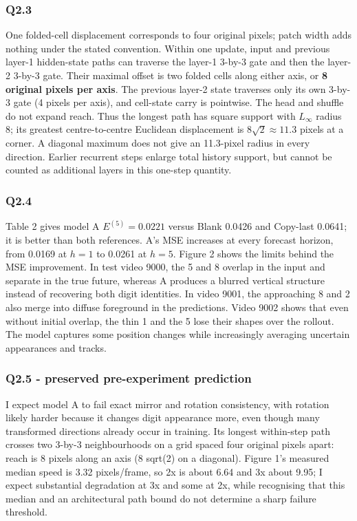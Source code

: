 \documentclass[
  10pt,
  a4paper,
]{article}
\begin{document}
\subsubsection{Q2.3}\label{q2.3}

One folded-cell displacement corresponds to four original pixels; patch
width adds nothing under the stated convention. Within one update, input
and previous layer-1 hidden-state paths can traverse the layer-1 3-by-3
gate and then the layer-2 3-by-3 gate. Their maximal offset is two
folded cells along either axis, or \textbf{8 original pixels per axis}.
The previous layer-2 state traverses only its own 3-by-3 gate (4 pixels
per axis), and cell-state carry is pointwise. The head and shuffle do
not expand reach. Thus the longest path has square support with
\(L_\infty\) radius 8; its greatest centre-to-centre Euclidean
displacement is \(8\sqrt2\approx11.3\) pixels at a corner. A diagonal
maximum does not give an 11.3-pixel radius in every direction. Earlier
recurrent steps enlarge total history support, but cannot be counted as
additional layers in this one-step quantity.

\subsubsection{Q2.4}\label{q2.4}

Table 2 gives model A \(E^{(5)}=0.0221\) versus Blank 0.0426 and
Copy-last 0.0641; it is better than both references. A's MSE increases
at every forecast horizon, from 0.0169 at \(h=1\) to 0.0261 at \(h=5\).
Figure 2 shows the limits behind the MSE improvement. In test video
9000, the 5 and 8 overlap in the input and separate in the true future,
whereas A produces a blurred vertical structure instead of recovering
both digit identities. In video 9001, the approaching 8 and 2 also merge
into diffuse foreground in the predictions. Video 9002 shows that even
without initial overlap, the thin 1 and the 5 lose their shapes over the
rollout. The model captures some position changes while increasingly
averaging uncertain appearances and tracks.

\subsubsection{Q2.5 - preserved pre-experiment
prediction}\label{q2.5---preserved-pre-experiment-prediction}

I expect model A to fail exact mirror and rotation consistency, with
rotation likely harder because it changes digit appearance more, even
though many transformed directions already occur in training. Its
longest within-step path crosses two 3-by-3 neighbourhoods on a grid
spaced four original pixels apart: reach is 8 pixels along an axis (8
sqrt(2) on a diagonal). Figure 1's measured median speed is 3.32
pixels/frame, so 2x is about 6.64 and 3x about 9.95; I expect
substantial degradation at 3x and some at 2x, while recognising that
this median and an architectural path bound do not determine a sharp
failure threshold.
\end{document}

